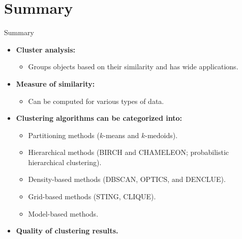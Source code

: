 \section{Summary}

\begin{frame}{Summary}
	\begin{itemize}
		\item \textbf{Cluster analysis:}
		      \begin{itemize}
			      \item Groups objects based on their similarity and has wide
			            applications.
		      \end{itemize}
		\item \textbf{Measure of similarity:}
		      \begin{itemize}
			      \item Can be computed for various types of data.
		      \end{itemize}
		\item \textbf{Clustering algorithms can be categorized into:}
		      \begin{itemize}
			      \item Partitioning methods ($k$-means and $k$-medoids).
			      \item Hierarchical methods (BIRCH and CHAMELEON; probabilistic
			            hierarchical clustering).
			      \item Density-based methods (DBSCAN, OPTICS, and DENCLUE).
			      \item Grid-based methods (STING, CLIQUE).
			      \item Model-based methods.
		      \end{itemize}
		\item \textbf{Quality of clustering results.}
	\end{itemize}
\end{frame}
